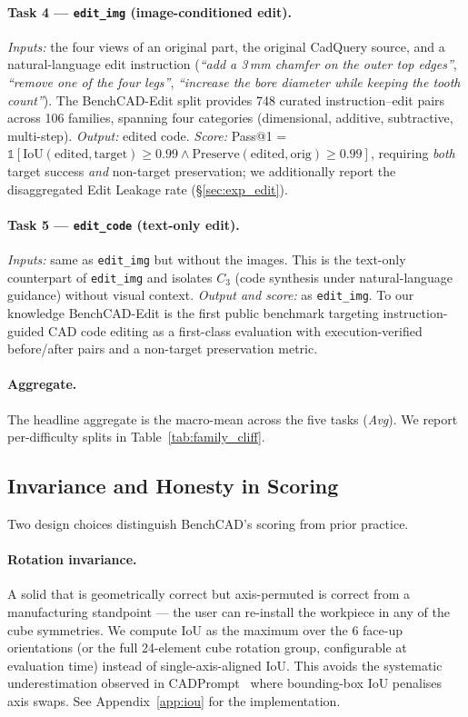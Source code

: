 \documentclass{article}
\begin{document}
\paragraph{Task 4 --- \texttt{edit\_img} (image-conditioned edit).} \emph{Inputs:} the four views of an original part, the original CadQuery source, and a natural-language edit instruction (\emph{``add a 3\,mm chamfer on the outer top edges''}, \emph{``remove one of the four legs''}, \emph{``increase the bore diameter while keeping the tooth count''}). The BenchCAD-Edit split provides 748 curated instruction--edit pairs across 106 families, spanning four categories (dimensional, additive, subtractive, multi-step). \emph{Output:} edited code. \emph{Score:} Pass@1 = $\mathbb{1}[\mathrm{IoU}(\text{edited}, \text{target}) \geq 0.99 \wedge \mathrm{Preserve}(\text{edited}, \text{orig}) \geq 0.99]$, requiring \emph{both} target success \emph{and} non-target preservation; we additionally report the disaggregated Edit Leakage rate (\S\ref{sec:exp_edit}).

\paragraph{Task 5 --- \texttt{edit\_code} (text-only edit).} \emph{Inputs:} same as \texttt{edit\_img} but without the images. This is the text-only counterpart of \texttt{edit\_img} and isolates $C_3$ (code synthesis under natural-language guidance) without visual context. \emph{Output and score:} as \texttt{edit\_img}. To our knowledge BenchCAD-Edit is the first public benchmark targeting instruction-guided CAD code editing as a first-class evaluation with execution-verified before/after pairs and a non-target preservation metric.

\paragraph{Aggregate.} The headline aggregate is the macro-mean across the five tasks (\emph{Avg}). We report per-difficulty splits in Table~\ref{tab:family_cliff}.

\subsection{Invariance and Honesty in Scoring}
\label{sec:scoring}
Two design choices distinguish BenchCAD's scoring from prior practice.

\paragraph{Rotation invariance.} A solid that is geometrically correct but axis-permuted is correct from a manufacturing standpoint --- the user can re-install the workpiece in any of the cube symmetries. We compute IoU as the maximum over the 6 face-up orientations (or the full 24-element cube rotation group, configurable at evaluation time) instead of single-axis-aligned IoU. This avoids the systematic underestimation observed in CADPrompt~\citep{Alrashedy2025} where bounding-box IoU penalises axis swaps. See Appendix~\ref{app:iou} for the implementation.
\end{document}
